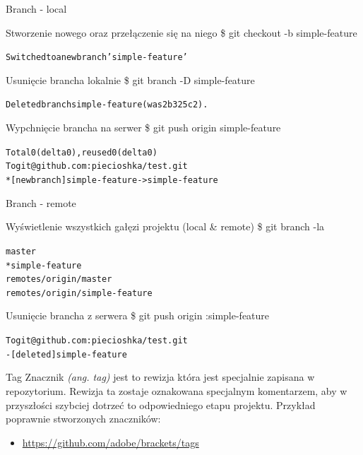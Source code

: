 \documentclass{beamer}
\begin{document}
\begin{frame}{Branch - local}
\begin{block}{Stworzenie nowego oraz przełączenie się na niego}
\$ git checkout -b simple-feature
\begin{alltt}
Switched to a new branch 'simple-feature'
\end{alltt}
\end{block}
\begin{block}{Usunięcie brancha lokalnie}
\$ git branch -D simple-feature
\begin{alltt}
Deleted branch simple-feature (was 2b325c2).
\end{alltt}
\end{block}
\begin{block}{Wypchnięcie brancha na serwer}
\$ git push origin simple-feature
\begin{alltt}
Total 0 (delta 0), reused 0 (delta 0) \\
To git@github.com:piecioshka/test.git \\
 * [new branch]      simple-feature -> simple-feature
\end{alltt}
\end{block}
\end{frame}

\begin{frame}{Branch - remote}
\begin{block}{Wyświetlenie wszystkich gałęzi projektu (local \& remote)}
\$ git branch -la
\begin{alltt}
  master \\
* simple-feature \\
  remotes/origin/master \\
  remotes/origin/simple-feature
\end{alltt}
\end{block}
\begin{block}{Usunięcie brancha z serwera}
\$ git push origin :simple-feature
\begin{alltt}
To git@github.com:piecioshka/test.git \\
 - [deleted]         simple-feature
\end{alltt}
\end{block}
\end{frame}

\begin{frame}{Tag}
Znacznik \textit{(ang. tag)} jest to rewizja która jest specjalnie zapisana w repozytorium.
Rewizja ta zostaje oznakowana specjalnym komentarzem, aby w przyszłości szybciej dotrzeć to odpowiedniego etapu projektu.
\vskip 0.5cm
Przykład poprawnie stworzonych znaczników:
\begin{itemize}
  \item \url{https://github.com/adobe/brackets/tags}
\end{itemize}
\end{frame}
\end{document}
